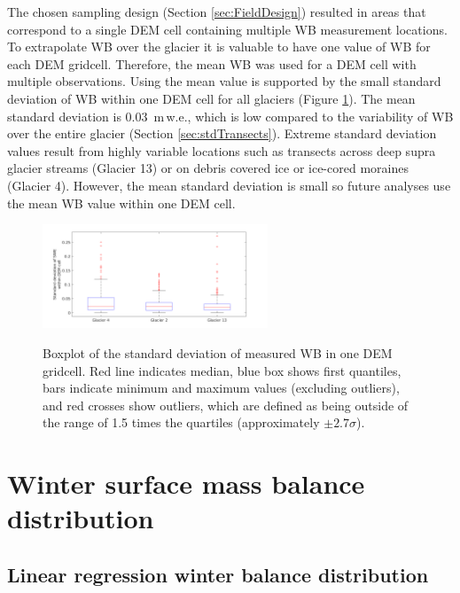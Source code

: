 \documentclass{sfuthesis}
\newcommand{\boxMatlab}{Red line indicates median, blue box shows first quantiles, bars indicate minimum and maximum values (excluding outliers), and red crosses show outliers, which are defined as being outside of the range of 1.5 times the quartiles (approximately $\pm2.7\sigma$). }
\begin{document}
\begin{appendices}
The chosen sampling design (Section \ref{sec:FieldDesign}) resulted in areas that correspond to a single DEM cell containing multiple WB measurement locations. To extrapolate WB over the glacier it is valuable to have one value of WB for each DEM gridcell. Therefore, the mean WB was used for a DEM cell with multiple observations. Using the mean value is supported by the small standard deviation of WB within one DEM cell for all glaciers (Figure \ref{fig:DEMcellSTD}). The mean standard deviation is 0.03 \,m\,w.e., which is low compared to the variability of WB over the entire glacier (Section \ref{sec:stdTransects}). Extreme standard deviation values result from highly variable locations such as transects across deep supra glacier streams (Glacier 13) or on debris covered ice or ice-cored moraines (Glacier 4). However, the mean standard deviation is small so future analyses use the mean WB value within one DEM cell. 

\begin{figure}[H]
	\centering
	\includegraphics[width = 0.6\textwidth]{DEMcellSTD.png}\\
	\caption[]{Boxplot of the standard deviation of measured WB in one DEM gridcell. \boxMatlab}
	\label{fig:DEMcellSTD}
\end{figure}


\chapter{Winter surface mass balance distribution}

\section{Linear regression winter balance distribution}


\end{appendices}
\end{document}
